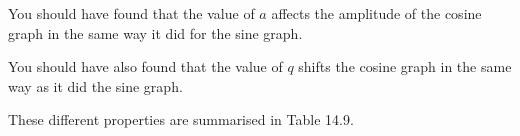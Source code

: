         
        

        \label{m39414*id88024}You should have found that the value of \begin{math}a\end{math} affects the amplitude of the cosine graph in the same way it did for the sine graph.\par 
        \label{m39414*id88038}You should have also found that the value of \begin{math}q\end{math} shifts the cosine graph in the same way as it did the sine graph.\par 
        \label{m39414*id88050}These different properties are summarised in Table 14.9.\par 
        
    
      
    
    \setlength\mytablespace{6\tabcolsep}
    \addtolength\mytablespace{4\arrayrulewidth}
    \setlength\mytablewidth{\linewidth}
        
    
    \setlength\mytableroom{\mytablewidth}
    \addtolength\mytableroom{-\mytablespace}
    
    \setlength\myfixedwidth{0pt}
    \setlength\mystarwidth{\mytableroom}
        \addtolength\mystarwidth{-\myfixedwidth}
        \divide{}
        
    
            
    
